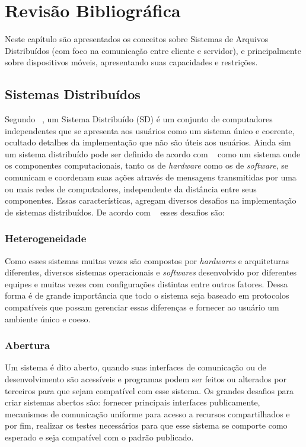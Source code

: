 
\chapter{Revisão Bibliográfica}

Neste capítulo são apresentados os conceitos sobre Sistemas de Arquivos Distribuídos (com foco na comunicação entre cliente e servidor), e principalmente sobre dispositivos móveis, apresentando suas capacidades e restrições.


\section{Sistemas Distribuídos}

    Segundo ~\cite{tanenbaum}, um Sistema Distribuído (SD) é um conjunto de computadores independentes que se apresenta aos usuários como um sistema único e coerente, ocultado detalhes da implementação que não são úteis aos usuários. Ainda sim um sistema distribuído pode ser definido de acordo com ~\cite{coulouris} como um sistema onde os componentes computacionais, tanto os de \textit{hardware} como os de \textit{software}, se comunicam e coordenam suas ações através de mensagens transmitidas por uma ou mais redes de computadores, independente da distância entre seus componentes. Essas características, agregam diversos desafios na implementação de sistemas distribuídos. De acordo com ~\cite{coulouris} esses desafios são:
    
    \subsection{Heterogeneidade}
        Como esses sistemas muitas vezes são compostos por \textit{hardwares} e arquiteturas diferentes, diversos sistemas operacionais e \textit{softwares} desenvolvido por diferentes equipes e muitas vezes com configurações distintas entre outros fatores. Dessa forma é de grande importância que todo o sistema seja baseado em protocolos compatíveis que possam gerenciar essas diferenças e fornecer ao usuário um ambiente único e coeso.
    
    \subsection{Abertura}
        Um sistema é dito aberto, quando suas interfaces de comunicação ou de desenvolvimento são acessíveis e programas podem ser feitos ou alterados por terceiros para que sejam compatível com esse sistema. Os grandes desafios para criar sistemas abertos são: fornecer principais interfaces publicamente, mecanismos de comunicação uniforme para acesso a recursos compartilhados e por fim, realizar os testes necessários para que esse sistema se comporte como esperado e seja compatível com o padrão publicado.
    
